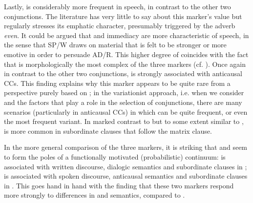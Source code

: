   Lastly,  is considerably more frequent in speech, in contrast to the other two conjunctions. The literature has very little to say about this marker’s  value but regularly stresses its emphatic character, presumably triggered by the adverb \textit{even}. It could be argued that  and immediacy are more characteristic of speech, in the sense that SP/W draws on material that is felt to be stronger or more emotive in order to persuade AD/R. This higher degree of  coincides with the fact that  is morphologically the most complex of the three markers (cf. ). Once again in contrast to the other two conjunctions,  is strongly associated with anticausal CCs. This finding explains why this marker appears to be quite rare from a perspective purely based on ; in the variationist approach, i.e. when we consider  and the factors that play a role in the selection of conjunctions, there are many scenarios (particularly in anticausal CCs) in which  can be quite frequent, or even the most frequent variant. In marked contrast to  but to some extent similar to ,  is more common in subordinate clauses that follow the matrix clause.

  In the more general comparison of the three markers, it is striking that  and  seem to form the poles of a functionally motivated (probabilistic) continuum:  is associated with written discourse, dialogic semantics and subordinate clauses in ;  is associated with spoken discourse, anticausal semantics and subordinate clauses in . This goes hand in hand with the finding that these two markers respond more strongly to differences in  and semantics, compared to .

